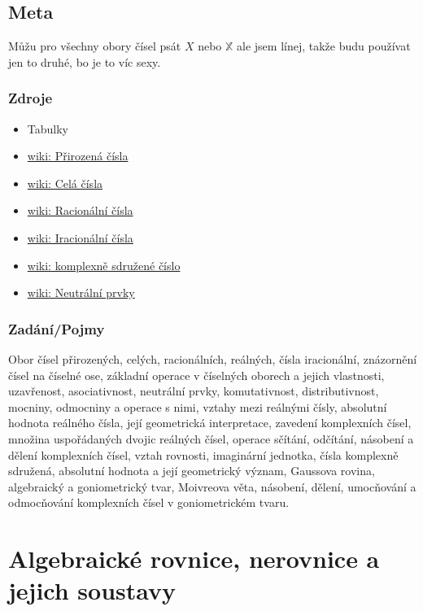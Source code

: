 \documentclass[12pt]{article}
\begin{document}
\subsection{Meta}
Můžu pro všechny obory čísel psát $X$ nebo $\mathbb{X}$ ale jsem línej, takže budu používat jen to druhé, bo je to víc sexy.
\subsubsection{Zdroje}
\begin{itemize}
\item Tabulky
\item \href{https://cs.wikipedia.org/wiki/P\%C5\%99irozen\%C3\%A9_\%C4\%8D\%C3\%ADslo}{wiki: Přirozená čísla}
\item \href{https://cs.wikipedia.org/wiki/Cel\%C3\%A9_\%C4\%8D\%C3\%ADslo}{wiki: Celá čísla}
\item \href{https://cs.wikipedia.org/wiki/Racion\%C3\%A1ln\%C3\%AD_\%C4\%8D\%C3\%ADslo}{wiki: Racionální čísla}
\item \href{https://cs.wikipedia.org/wiki/Iracion\%C3\%A1ln\%C3\%AD_\%C4\%8D\%C3\%ADslo}{wiki: Iracionální čísla}
\item \href{https://cs.wikipedia.org/wiki/Komplexn\%C4\%9B_sdru\%C5\%BEen\%C3\%A9_\%C4\%8D\%C3\%ADslo}{wiki: komplexně sdružené číslo}
\item \href{https://cs.wikipedia.org/wiki/Neutr\%C3\%A1ln\%C3\%AD_prvek}{wiki: Neutrální prvky}
\end{itemize}
\subsubsection{Zadání/Pojmy}
Obor čísel přirozených, celých, racionálních, reálných, čísla iracionální, znázornění čísel na číselné ose, základní operace v číselných oborech a jejich vlastnosti, uzavřenost, asociativnost, neutrální prvky, komutativnost, distributivnost, mocniny, odmocniny a operace s nimi, vztahy mezi reálnými čísly, absolutní hodnota reálného čísla, její geometrická interpretace, zavedení komplexních čísel, množina uspořádaných dvojic reálných čísel, operace sčítání, odčítání, násobení a dělení komplexních čísel, vztah rovnosti, imaginární jednotka, čísla komplexně sdružená, absolutní hodnota a její geometrický význam, Gaussova rovina, algebraický a goniometrický tvar, Moivreova věta, násobení, dělení, umocňování a odmocňování komplexních čísel v goniometrickém tvaru.

\section{Algebraické rovnice, nerovnice a jejich soustavy}
\end{document}
